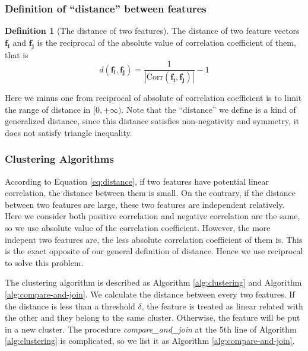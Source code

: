 \documentclass{ieeeaccess}
\theoremstyle{definition}
\newtheorem{defn}{Definition}
\begin{document}
\subsubsection{Definition of ``distance'' between features}

\begin{defn}[The distance of two features]
    \label{def:distance}
    The distance of two feature vectors $\bm{f_i}$ and $\bm{f_j}$ is the reciprocal of the absolute value of correlation coefficient of them, that is
    \begin{equation}
        \label{eq:distance}
        d(\bm{f_i}, \bm{f_j}) = \frac{1}{|\text{Corr}(\bm{f_i}, \bm{f_j})|}-1
    \end{equation}
    \end{defn}

Here we minus one from reciprocal of absolute of correlation coefficient is to limit the range of distance in $[0, +\infty)$. Note that the ``distance'' we define is a kind of generalized distance, since this distance satisfies non-negativity and symmetry, it does not satisfy triangle inequality. 

\subsubsection{Clustering Algorithms}

According to Equation \ref{eq:distance}, if two features have potential linear correlation, the distance between them is small. On the contrary, if the distance between two features are large, these two features are independent relatively. Here we consider both positive correlation and negative correlation are the same, so we use absolute value of the correlation coefficient. However, the more indepent two features are, the less absolute correlation coefficient of them is. This is the exact opposite of our general definition of distance. Hence we use reciprocal to solve this problem.

The clustering algorithm is described as Algorithm \ref{alg:clustering} and Algorithm \ref{alg:compare-and-join}. We calculate the distance between every two features. If the distance is less than a threshold $\delta$, the feature is treated as linear related with the other and they belong to the same cluster. Otherwise, the feature will be put in a new cluster. The procedure \emph{compare\_and\_join} at the 5th line of Algorithm \ref{alg:clustering} is complicated, so we list it as Algorithm \ref{alg:compare-and-join}.
\end{document}

